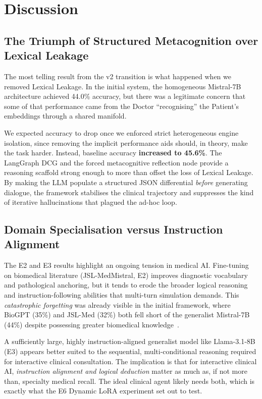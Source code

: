 \chapter{Discussion}
\label{Chapter7}

\section{The Triumph of Structured Metacognition over Lexical Leakage}

The most telling result from the v2 transition is what happened when we removed Lexical Leakage. In the initial system, the homogeneous Mistral-7B architecture achieved 44.0\% accuracy, but there was a legitimate concern that some of that performance came from the Doctor ``recognising'' the Patient's embeddings through a shared manifold.

We expected accuracy to drop once we enforced strict heterogeneous engine isolation, since removing the implicit performance aids should, in theory, make the task harder. Instead, baseline accuracy \textbf{increased to 45.6\%}. The LangGraph DCG and the forced metacognitive reflection node provide a reasoning scaffold strong enough to more than offset the loss of Lexical Leakage. By making the LLM populate a structured JSON differential \textit{before} generating dialogue, the framework stabilises the clinical trajectory and suppresses the kind of iterative hallucinations that plagued the ad-hoc loop.

\section{Domain Specialisation versus Instruction Alignment}

The E2 and E3 results highlight an ongoing tension in medical AI. Fine-tuning on biomedical literature (JSL-MedMistral, E2) improves diagnostic vocabulary and pathological anchoring, but it tends to erode the broader logical reasoning and instruction-following abilities that multi-turn simulation demands. This \textit{catastrophic forgetting} was already visible in the initial framework, where BioGPT (35\%) and JSL-Med (32\%) both fell short of the generalist Mistral-7B (44\%) despite possessing greater biomedical knowledge~\cite{tang2023medagents}.

A sufficiently large, highly instruction-aligned generalist model like Llama-3.1-8B (E3) appears better suited to the sequential, multi-conditional reasoning required for interactive clinical consultation. The implication is that for interactive clinical AI, \textit{instruction alignment and logical deduction} matter as much as, if not more than, specialty medical recall. The ideal clinical agent likely needs both, which is exactly what the E6 Dynamic LoRA experiment set out to test.

